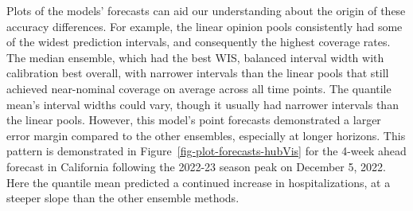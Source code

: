 \documentclass[
  article,
  shortnames,
  notitle]{jss}
\begin{document}
Plots of the models' forecasts can aid our understanding about the
origin of these accuracy differences. For example, the linear opinion
pools consistently had some of the widest prediction intervals, and
consequently the highest coverage rates. The median ensemble, which had
the best WIS, balanced interval width with calibration best overall,
with narrower intervals than the linear pools that still achieved
near-nominal coverage on average across all time points. The quantile
mean's interval widths could vary, though it usually had narrower
intervals than the linear pools. However, this model's point forecasts
demonstrated a larger error margin compared to the other ensembles,
especially at longer horizons. This pattern is demonstrated in
Figure~\ref{fig-plot-forecasts-hubVis} for the 4-week ahead forecast in
California following the 2022-23 season peak on December 5, 2022. Here
the quantile mean predicted a continued increase in hospitalizations, at
a steeper slope than the other ensemble methods.
\end{document}
